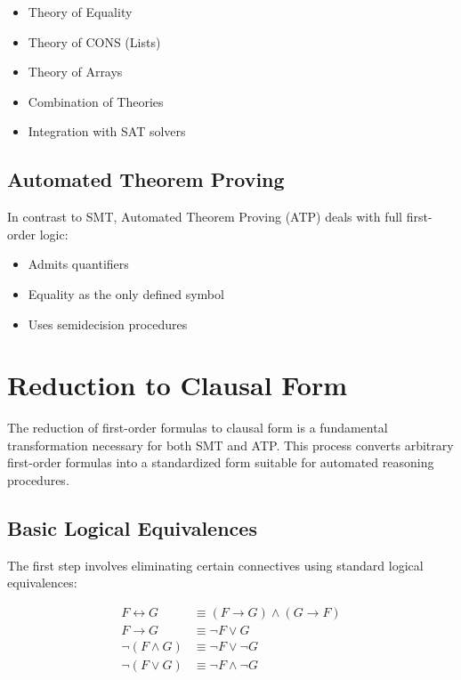 \documentclass[11pt,a4paper]{article}
\theoremstyle{definition}
\theoremstyle{plain}
\theoremstyle{remark}
\begin{document}
\begin{itemize}
    \item Theory of Equality
    \item Theory of CONS (Lists)
    \item Theory of Arrays
    \item Combination of Theories
    \item Integration with SAT solvers
\end{itemize}

\subsection{Automated Theorem Proving}

In contrast to SMT, Automated Theorem Proving (ATP) deals with full first-order logic:

\begin{itemize}
    \item Admits quantifiers
    \item Equality as the only defined symbol
    \item Uses semidecision procedures
\end{itemize}

\section{Reduction to Clausal Form}

The reduction of first-order formulas to clausal form is a fundamental transformation necessary for both SMT and ATP. This process converts arbitrary first-order formulas into a standardized form suitable for automated reasoning procedures.

\subsection{Basic Logical Equivalences}

The first step involves eliminating certain connectives using standard logical equivalences:

\begin{align*}
F \leftrightarrow G &\equiv (F \rightarrow G) \wedge (G \rightarrow F) \\
F \rightarrow G &\equiv \neg F \vee G \\
\neg (F \wedge G) &\equiv \neg F \vee \neg G \\
\neg (F \vee G) &\equiv \neg F \wedge \neg G
\end{align*}
\end{document}
